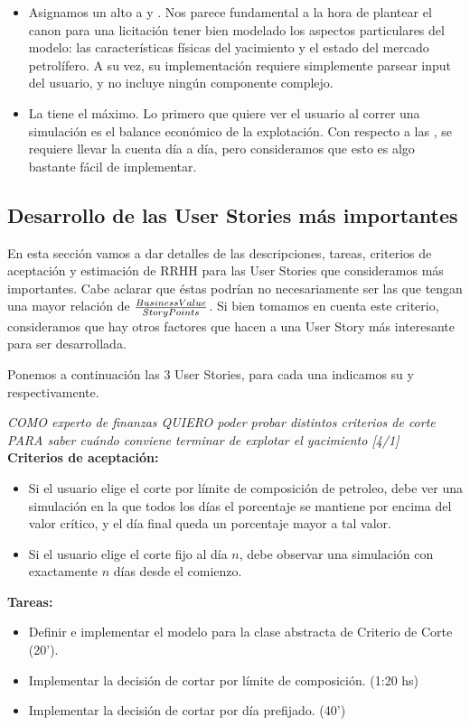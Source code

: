 \begin{itemize}
    \item Asignamos un alto \BV{} a  y . Nos parece fundamental a la hora de plantear el canon para una licitación tener bien modelado los aspectos particulares del modelo: las características físicas del yacimiento y el estado del mercado petrolífero. A su vez, su implementación requiere simplemente parsear input del usuario, y no incluye ningún componente complejo.
    
    \item La  tiene el \BV{} máximo. Lo primero que quiere ver el usuario al correr una simulación es el balance económico de la explotación. Con respecto a las \SP{}, se requiere llevar la cuenta día a día, pero consideramos que esto es algo bastante fácil de implementar. 
\end{itemize}

\newpage
\subsection{Desarrollo de las User Stories más importantes}

En esta sección vamos a dar detalles de las descripciones, tareas, criterios de aceptación y estimación de RRHH para las User Stories que consideramos más importantes. Cabe aclarar que éstas podrían no necesariamente ser las que tengan una mayor relación de \( \frac{Business Value{}}{Story Points{}} \). Si bien tomamos en cuenta este criterio, consideramos que hay otros factores que hacen a una User Story más interesante para ser desarrollada. 

Ponemos a continuación las 3 User Stories, para cada una indicamos su 
\BV{} y \SP{} respectivamente. 

\begin{tcolorbox}
\textit{COMO experto de finanzas QUIERO poder probar distintos criterios de corte PARA saber cuándo conviene terminar de explotar el yacimiento [4/1]}\\

\textbf{Criterios de aceptación:}
\begin{itemize}
	\item Si el usuario elige el corte por límite de composición de petroleo, debe ver una simulación en la que todos los días el porcentaje se mantiene por encima del valor crítico, y el día final queda un porcentaje mayor a tal valor.
    \item Si el usuario elige el corte fijo al día $n$, debe observar una simulación con exactamente $n$ días desde el comienzo.
\end{itemize}

\textbf{Tareas:}
\begin{itemize}
	\item Definir e implementar el modelo para la clase abstracta de 
    Criterio de Corte (20').
    \item Implementar la decisión de cortar por límite de composición. (1:20 hs)
    \item Implementar la decisión de cortar por día prefijado. (40')
\end{itemize}
\end{tcolorbox}

